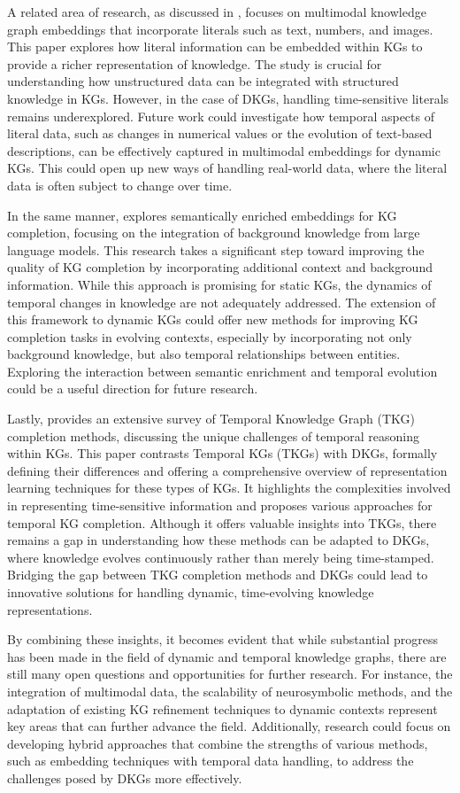 A related area of research, as discussed in \cite{gesese2020}, focuses on multimodal knowledge graph embeddings that incorporate literals such as text, numbers, and images. 
This paper explores how literal information can be embedded within KGs to provide a richer representation of knowledge. The study is crucial for understanding how unstructured data can be 
integrated with structured knowledge in KGs. However, in the case of DKGs, handling time-sensitive literals remains underexplored. Future work could investigate how temporal aspects of literal 
data, such as changes in numerical values or the evolution of text-based descriptions, can be effectively captured in multimodal embeddings for dynamic KGs. This could open up new ways of 
handling real-world data, where the literal data is often subject to change over time.

In the same manner, \cite{alam2024semantical} explores semantically enriched embeddings for KG completion, focusing on the integration of background knowledge from large language models. 
This research takes a significant step toward improving the quality of KG completion by incorporating additional context and background information. While this approach is promising for 
static KGs, the dynamics of temporal changes in knowledge are not adequately addressed. The extension of this framework to dynamic KGs could offer new methods for improving KG completion tasks
 in evolving contexts, especially by incorporating not only background knowledge, but also temporal relationships between entities. Exploring the interaction between semantic enrichment and 
 temporal evolution could be a useful direction for future research.

Lastly, \cite{cai2023} provides an extensive survey of Temporal Knowledge Graph (TKG) completion methods, discussing the unique challenges of temporal reasoning within KGs. 
This paper contrasts Temporal KGs (TKGs) with DKGs, formally defining their differences and offering a comprehensive overview of representation learning techniques for these types of KGs. 
It highlights the complexities involved in representing time-sensitive information and proposes various approaches for temporal KG completion. Although it offers valuable insights into TKGs, 
there remains a gap in understanding how these methods can be adapted to DKGs, where knowledge evolves continuously rather than merely being time-stamped. Bridging the gap between TKG completion
methods and DKGs could lead to innovative solutions for handling dynamic, time-evolving knowledge representations.

By combining these insights, it becomes evident that while substantial progress has been made in the field of dynamic and temporal knowledge graphs, there are still many open questions and 
opportunities for further research. For instance, the integration of multimodal data, the scalability of neurosymbolic methods, and the adaptation of existing KG refinement techniques to dynamic
contexts represent key areas that can further advance the field. Additionally, research could focus on developing hybrid approaches that combine the strengths of various methods, such as 
embedding techniques with temporal data handling, to address the challenges posed by DKGs more effectively.